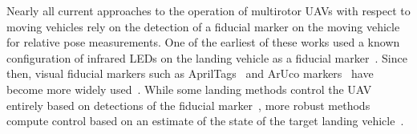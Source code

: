 Nearly all current approaches to the operation of multirotor UAVs with respect to moving
vehicles rely on the
detection of a fiducial marker on the moving vehicle for relative pose
measurements. One of the earliest of these works
used a known configuration of infrared LEDs on the landing vehicle as a fiducial
marker~\cite{wenzel2011automatic}.
Since then, visual fiducial markers such as
AprilTags~\cite{olson2011tags} and ArUco markers~\cite{garrido2016generation}
have become more widely
used~\cite{ling2014precision,borowczyk2017autonomous,marantos2018vision,
araar2017vision}.
While some landing methods control the UAV entirely based on detections of the
fiducial marker~\cite{lee2012autonomous,wynn2019visual}, more robust methods
compute control based on an estimate of the state of the target landing
vehicle~\cite{ling2014precision}.

